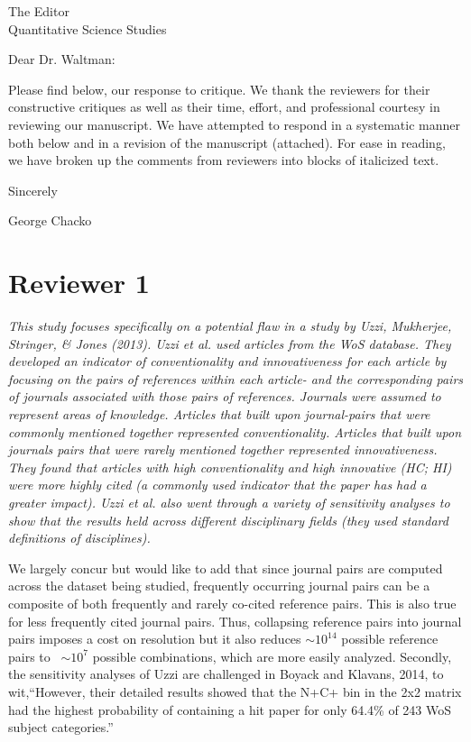 \documentclass[11pt, oneside]{article}   	%
\begin{document}

The Editor\\
Quantitative Science Studies

Dear Dr. Waltman:

Please find below, our response to critique. We thank the reviewers for their constructive critiques as well as their time, effort, and professional courtesy in reviewing our manuscript. We have attempted to respond  in a systematic manner both below and in a revision of the manuscript (attached). For ease in reading, we have broken up the comments from reviewers into blocks of italicized text.

Sincerely

George Chacko

\section{Reviewer 1}

\emph{This study focuses specifically on a potential flaw in a study by Uzzi, Mukherjee, Stringer, \& Jones  (2013).  Uzzi et al. used articles from the WoS database. They developed an indicator of conventionality and innovativeness for each article by focusing on the pairs of references within each article- and the corresponding pairs of journals associated with those pairs of references. Journals were assumed to represent areas of knowledge. Articles that built upon journal-pairs that were commonly mentioned together represented conventionality.  Articles that built upon journals pairs that were rarely mentioned together represented innovativeness. They found that articles with high conventionality and high innovative (HC; HI) were more highly cited (a commonly used indicator that the paper has had a greater impact). Uzzi et al. also went through a variety of sensitivity analyses to show that the results held across different disciplinary fields (they used standard definitions of disciplines).}   

We largely concur but would like to add that since journal pairs are computed across the dataset being studied, frequently occurring journal pairs can be a composite of both frequently and rarely co-cited reference pairs. This is also true for less frequently cited journal pairs. Thus, collapsing reference pairs into journal pairs imposes a cost on resolution but it also reduces $\sim10^{14}$ possible reference pairs to ~$\sim10^7$ possible combinations, which are more easily analyzed. Secondly, the sensitivity analyses of Uzzi are challenged in Boyack and Klavans, 2014, to wit,``However, their detailed results showed that the N+C+ bin in the 2x2 matrix had the highest probability of containing a hit paper for only 64.4\% of 243 WoS subject categories.'' 
\end{document}
